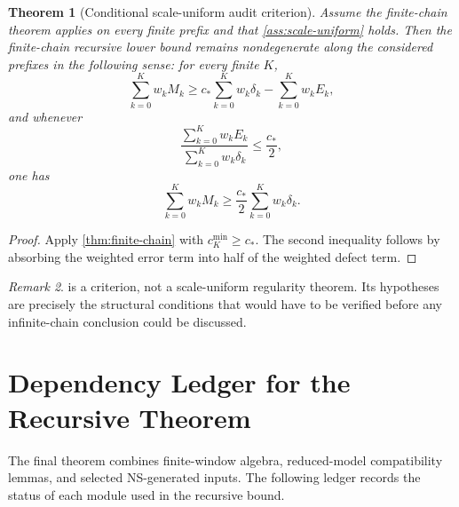 \documentclass[11pt]{article}
\numberwithin{equation}{section}
\theoremstyle{plain}
\newtheorem{theorem}{Theorem}[section]
\theoremstyle{definition}
\theoremstyle{remark}
\newtheorem{remark}[theorem]{Remark}
\begin{document}
\begin{theorem}[Conditional scale-uniform audit criterion]\label{thm:conditional-scale}
Assume the finite-chain theorem applies on every finite prefix and that
\cref{ass:scale-uniform} holds.  Then the finite-chain recursive lower bound
remains nondegenerate along the considered prefixes in the following sense:
for every finite \(K\),
\[
  \sum_{k=0}^K w_kM_k
  \ge
  c_*\sum_{k=0}^K w_k\delta_k-\sum_{k=0}^K w_kE_k,
\]
and whenever
\[
  \frac{\sum_{k=0}^K w_kE_k}{\sum_{k=0}^K w_k\delta_k}\le \frac{c_*}{2},
\]
one has
\[
  \sum_{k=0}^K w_kM_k
  \ge
  \frac{c_*}{2}\sum_{k=0}^K w_k\delta_k.
\]
\end{theorem}

\begin{proof}
Apply \cref{thm:finite-chain} with \(c_K^{\min}\ge c_*\).  The second
inequality follows by absorbing the weighted error term into half of the
weighted defect term.
\end{proof}

\begin{remark}
 is a criterion, not a scale-uniform regularity
theorem.  Its hypotheses are precisely the structural conditions that would
have to be verified before any infinite-chain conclusion could be discussed.
\end{remark}


\section{Dependency Ledger for the Recursive Theorem}

The final theorem combines finite-window algebra, reduced-model compatibility
lemmas, and selected NS-generated inputs.  The following ledger records the
status of each module used in the recursive bound.
\end{document}
